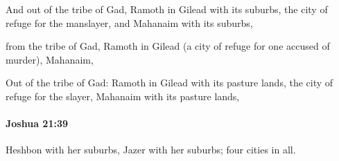 			\begin{versebox}
					\item[BHS] 
					\item[ASV] And out of the tribe of Gad, Ramoth in Gilead with its suburbs, the city of refuge for the manslayer, and Mahanaim with its suburbs,
					\item[NIV] from the tribe of Gad, Ramoth in Gilead (a city of refuge for one accused of murder), Mahanaim,
					\item[NRSV] Out of the tribe of Gad: Ramoth in Gilead with its pasture lands, the city of refuge for the slayer, Mahanaim with its pasture lands,
			\end{versebox}

		\paragraph{Joshua 21:39} %
			\label{JOSHUA-21-39}

			Heshbon with her suburbs, Jazer with her suburbs; four cities in all.

